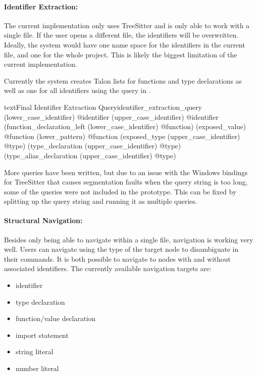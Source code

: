 \documentclass[../thesis.tex]{subfiles}
\begin{document}
\paragraph{Identifier Extraction:}
The current implementation only uses TreeSitter and is only able to work with a single file.
If the user opens a different file, the identifiers will be overwritten.
Ideally, the system would have one name space for the identifiers in the current file,
and one for the whole project.
This is likely the biggest limitation of the current implementation.

Currently the system creates Talon lists for functions and type declarations as well as one for all identifiers using the query in .
\begin{code}{text}{Final Identifier Extraction Query}{identifier_extraction_query}
(lower_case_identifier) @identifier 
(upper_case_identifier) @identifier
(function_declaration_left (lower_case_identifier) @function)
(exposed_value) @function
(lower_pattern) @function
(exposed_type (upper_case_identifier) @type)
(type_declaration (upper_case_identifier) @type)
(type_alias_declaration (upper_case_identifier) @type)
\end{code}
More queries have been written, but due to an issue with the Windows bindings for TreeSitter
that causes segmentation faults when the query string is too long, some of the queries
were not included in the prototype.
This can be fixed by splitting up the query string and running it as multiple queries.

\paragraph{Structural Navigation:}
Besides only being able to navigate within a single file, navigation is working very well.
Users can navigate using the type of the target node to disambiguate in their commands.
It is both possible to navigate to nodes with and without associated identifiers.
The currently available navigation targets are:
\begin{itemize}
    \item identifier
    \item type declaration
    \item function/value declaration
    \item import statement
    \item string literal
    \item number literal
\end{itemize}
\end{document}
